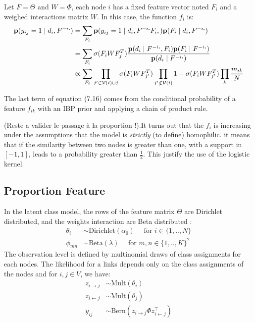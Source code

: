 Let $F=\Theta$ and $W=\Phi$, each node $i$ has a fixed feature vector noted $F_i$ and a weighed interactions matrix $W$. In this case, the function $f_i$ is:
\begin{align}
\mathbf{p}(y_{ij}=1 \mid d_i, F^{-i\bm{.}}) &= \sum_{F_i} \mathbf{p}(y_{ij}=1 \mid d_i, F^{-i\bm{.}} F_i,) \mathbf{p}(F_i \mid d_i, F^{-i\bm{.}}) \\
&= \sum_{F_i} \sigma(F_iWF_j^T) \frac{\mathbf{p}(d_i \mid F^{-i\bm{.}}, F_i) \mathbf{p}(F_i\mid F^{-i\bm{.}}) }{\mathbf{p}(d_i\mid F^{-i\bm{.}})}\\
&\propto \sum_{F_i} \prod_{j' \in \mathcal{V}(i) \cup {j}} \sigma(F_iWF_{j'}^T)\prod_{j' \notin \mathcal{V}(i)} 1-\sigma(F_iWF_{j'}^T) \prod_k \frac{m_{ik}}{N}
\end{align}

The last term of equation (7.16) comes from the conditional probability of a feature $f_{ik}$ with an IBP prior and applying a chain of product rule. 

(Reste a valider le passage à la proportion !).It turns out that the $f_i$ is increasing under the assumptions that the model is \emph{strictly} (to define) homophilic. it means that if the similarity between two nodes is greater than one, with a support in $[-1, 1]$, leads to a probability greater than $\frac{1}{2}$. This justify the use of the logistic kernel. 


\subsection{Proportion Feature}

In the latent class model, the rows of the feature matrix $\Theta$ are Dirichlet distributed, and the weights interaction are Beta distributed : 
\begin{align}
\theta_i &\sim \mathrm{Dirichlet}(\alpha_0) \quad\text{ for }  i \in \{1, .., N\} \\
\phi_{mn} &\sim \mathrm{Beta}(\lambda) \quad\text{ for }  m,n \in \{1, .., K\}^2 
\end{align}
The observation level is defined by multinomial draws of class assignments for each nodes. The likelihood for a links depends only on the class assignments of the nodes  and for $i, j \in V$, we have:  
\begin{align}
z_{i\rightarrow j} &\sim \mathrm{Mult}(\theta_i) \\
z_{i\leftarrow j} &\sim \mathrm{Mult}(\theta_j) \\
y_{ij} &\sim \mathrm{Bern}(z_{i\rightarrow j} \Phi z_{i\leftarrow j}^\top)
\end{align}

